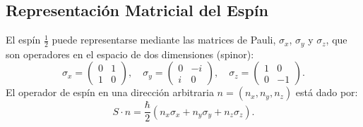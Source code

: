 \subsection*{Representación Matricial del Espín}
\noindent
El espín $\frac{1}{2}$ puede representarse mediante las matrices de Pauli, $\sigma_x$, $\sigma_y$ y $\sigma_z$, que son operadores en el espacio de dos dimensiones (spinor):
\[
\sigma_x = 
\begin{pmatrix}
0 & 1 \\
1 & 0
\end{pmatrix}, \quad
\sigma_y = 
\begin{pmatrix}
0 & -i \\
i & 0
\end{pmatrix}, \quad
\sigma_z = 
\begin{pmatrix}
1 & 0 \\
0 & -1
\end{pmatrix}.
\]
El operador de espín en una dirección arbitraria ${n} = (n_x, n_y, n_z)$ está dado por:
\[
{S} \cdot {n} = \frac{\hbar}{2}(n_x \sigma_x + n_y \sigma_y + n_z \sigma_z).
\]
